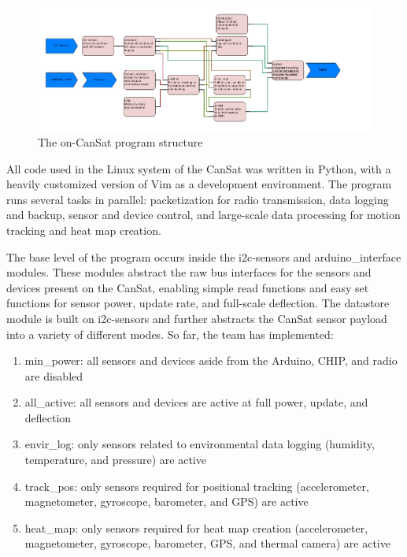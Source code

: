 \documentclass[]{report}
\begin{document}
\begin{figure}
	\centering
		\includegraphics[scale=0.7]{CanSat-software-diagram.png}
	\caption{The on-CanSat program structure}
	\label{pstruct}
\end{figure}

All code used in the Linux system of the CanSat was written in Python, with a heavily customized version of Vim as a development environment. The program runs several tasks in parallel: packetization for radio transmission, data logging and backup, sensor and device control, and large-scale data processing for motion tracking and heat map creation.

The base level of the program occurs inside the i2c-sensors and arduino\_interface modules. These modules abstract the raw bus interfaces for the sensors and devices present on the CanSat, enabling simple read functions and easy set functions for sensor power, update rate, and full-scale deflection. The datastore module is built on i2c-sensors and further abstracts the CanSat sensor payload into a variety of different modes. So far, the team has implemented:

\begin{enumerate}
	\item min\_power: all sensors and devices aside from the Arduino, CHIP, and radio are disabled
	\item all\_active: all sensors and devices are active at full power, update, and deflection
	\item envir\_log: only sensors related to environmental data logging (humidity, temperature, and pressure) are active
	\item track\_pos: only sensors required for positional tracking (accelerometer, magnetometer, gyroscope, barometer, and GPS) are active
	\item heat\_map: only sensors required for heat map creation (accelerometer, magnetometer, gyroscope, barometer, GPS, and thermal camera) are active
\end{enumerate}
\end{document}
